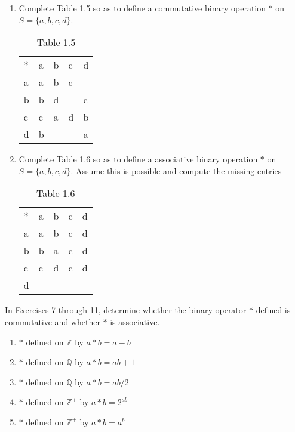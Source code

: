 \documentclass[10pt,letterpaper]{article}
\begin{document}
  \begin{enumerate}[resume]
    \item Complete Table 1.5 so as to define a commutative binary operation $\ast $ on $S=\{a,b,c,d\}$. \\
    \begin{table}[h]
      \begin{center}
        \captionsetup{labelformat=empty}
        \caption{Table 1.5}
        \begin{tabular}{l!{\vrule width 2pt}l|l|l|l} 
          $\ast$ & a & b & c & d \\
          a & a & b & c &  \\
          \hline
          b & b & d &  & c \\
          \hline
          c & c & a & d & b \\
          \hline
          d & b &  &  & a
        \end{tabular}
      \end{center}
    \end{table}
    \item Complete Table 1.6 so as to define a associative binary operation $\ast $ on $S=\{a,b,c,d\}$. 
          Assume this is possible and compute the missing entries\\
    \begin{table}[h]
      \begin{center}
        \captionsetup{labelformat=empty}
        \caption{Table 1.6}
        \begin{tabular}{l!{\vrule width 2pt}l|l|l|l} 
          $\ast$ & a & b & c & d \\
          a & a & b & c & d \\
          \hline
          b & b & a & c & d \\
          \hline
          c & c & d & c & d \\
          \hline
          d &  &  &  & 
        \end{tabular}
      \end{center}
    \end{table}
  \end{enumerate}

  In Exercises 7 through 11, determine whether the binary operator $\ast$ defined is commutative and whether $\ast$ is associative.
  \begin{enumerate}[resume]
    \item $\ast$ defined on $\mathbb{Z}$ by $a \ast b = a-b$
    \item $\ast$ defined on $\mathbb{Q}$ by $a \ast b = ab+1$
    \item $\ast$ defined on $\mathbb{Q}$ by $a \ast b = ab/2$
    \item $\ast$ defined on $\mathbb{Z}^+$ by $a \ast b = 2^{ab}$
    \item $\ast$ defined on $\mathbb{Z}^+$ by $a \ast b = a^b$
  \end{enumerate}
\end{document}
